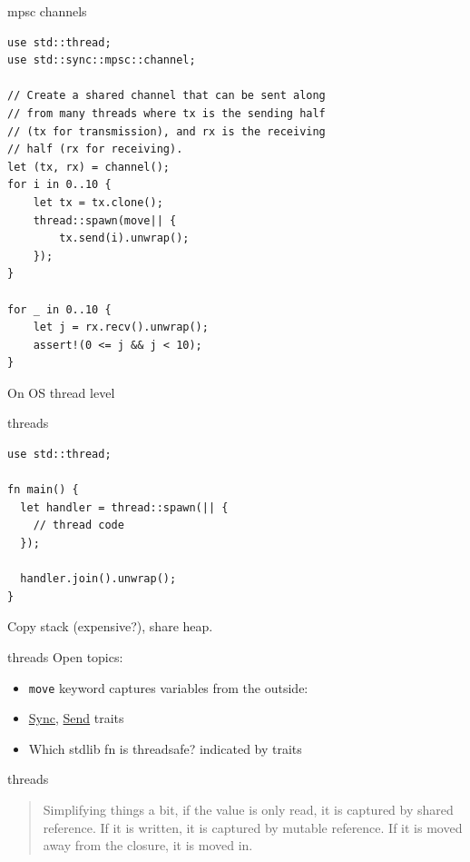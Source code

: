 \documentclass{beamer}
\begin{document}
\begin{frame}[fragile]{mpsc channels}
  \begin{verbatim}
use std::thread;
use std::sync::mpsc::channel;

// Create a shared channel that can be sent along
// from many threads where tx is the sending half
// (tx for transmission), and rx is the receiving
// half (rx for receiving).
let (tx, rx) = channel();
for i in 0..10 {
    let tx = tx.clone();
    thread::spawn(move|| {
        tx.send(i).unwrap();
    });
}

for _ in 0..10 {
    let j = rx.recv().unwrap();
    assert!(0 <= j && j < 10);
}
  \end{verbatim}
\end{frame}

\begin{frame}[standout]
  On OS thread level
\end{frame}

\begin{frame}[fragile]{threads}
  \begin{verbatim}
use std::thread;

fn main() {
  let handler = thread::spawn(|| {
    // thread code
  });

  handler.join().unwrap();
}
  \end{verbatim}

  Copy stack (expensive?), share heap.
\end{frame}

\begin{frame}[fragile]{threads}
  Open topics:
  \begin{itemize}
    \item \texttt{move} keyword captures variables from the outside: 
    \item \href{https://doc.rust-lang.org/std/marker/trait.Sync.html}{Sync}, \href{https://doc.rust-lang.org/std/marker/trait.Send.html}{Send} traits
    \item Which stdlib fn is threadsafe? indicated by traits
  \end{itemize}
\end{frame}

\begin{frame}[fragile]{threads}
  \begin{quote}
Simplifying things a bit, if the value is only read, it is captured by shared reference. If it is written, it is captured by mutable reference. If it is moved away from the closure, it is moved in.
  \end{quote}
\end{frame}
\end{document}
